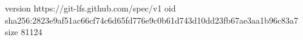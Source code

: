 version https://git-lfs.github.com/spec/v1
oid sha256:2823e9af51ac66cf74c6d65fd776e9c0b61d743d10dd23fb67ae3aa1b96c83a7
size 81124

